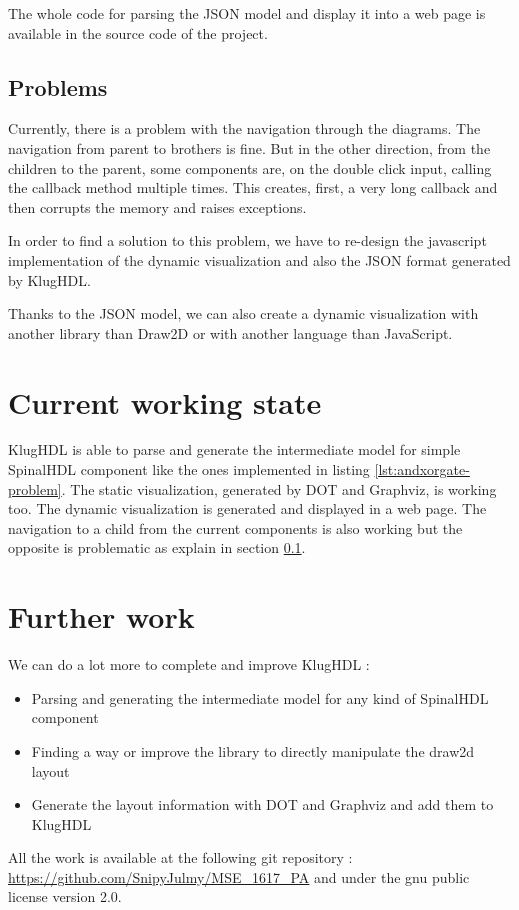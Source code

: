 The whole code for parsing the JSON model and display it into a web page is
available in the source code of the project.

\subsection{Problems}
\label{sec:problems}

Currently, there is a problem with the navigation through the diagrams. The
navigation from parent to brothers is fine. But in the other direction, from the
children to the parent, some components are, on the double click input, calling
the callback method multiple times. This creates, first, a very long
callback and then corrupts the memory and raises exceptions.

In order to find a solution to this problem, we have to re-design the javascript
implementation of the dynamic visualization and also the JSON format generated
by KlugHDL.

Thanks to the JSON model, we can also create a dynamic visualization with
another library than Draw2D or with another language than JavaScript.

\section{Current working state}
\label{sec:current-working-state}

KlugHDL is able to parse and generate the intermediate model for simple
SpinalHDL component like the ones implemented in listing
\ref{lst:andxorgate-problem}. The static visualization, generated by DOT and
Graphviz, is working too. The dynamic visualization is generated and displayed
in a web page. The navigation to a child from the current components is also
working but the opposite is problematic as explain in section \ref{sec:problems}.

\section{Further work}
\label{sec:further-work}

We can do a lot more to complete and improve KlugHDL :
\begin{itemize}
\item Parsing and generating the intermediate model for any kind of SpinalHDL
  component
\item Finding a way or improve the library to directly manipulate the draw2d
  layout
\item Generate the layout information with DOT and Graphviz and add them to KlugHDL
\end{itemize}

All the work is available at the following git repository :
\url{https://github.com/SnipyJulmy/MSE_1617_PA} and under the gnu public license version 2.0.


